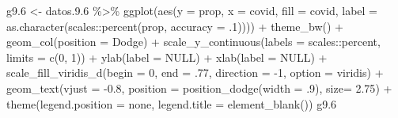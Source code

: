 \documentclass[
  12pt,
]{book}
\newenvironment{Shaded}{\begin{snugshade}}{\end{snugshade}}
\newcommand{\AttributeTok}[1]{\textcolor[rgb]{0.77,0.63,0.00}{#1}}
\newcommand{\ConstantTok}[1]{\textcolor[rgb]{0.00,0.00,0.00}{#1}}
\newcommand{\DecValTok}[1]{\textcolor[rgb]{0.00,0.00,0.81}{#1}}
\newcommand{\FloatTok}[1]{\textcolor[rgb]{0.00,0.00,0.81}{#1}}
\newcommand{\FunctionTok}[1]{\textcolor[rgb]{0.00,0.00,0.00}{#1}}
\newcommand{\NormalTok}[1]{#1}
\newcommand{\OtherTok}[1]{\textcolor[rgb]{0.56,0.35,0.01}{#1}}
\newcommand{\SpecialCharTok}[1]{\textcolor[rgb]{0.00,0.00,0.00}{#1}}
\newcommand{\StringTok}[1]{\textcolor[rgb]{0.31,0.60,0.02}{#1}}
\begin{document}
\begin{Shaded}
\begin{Highlighting}[]
\NormalTok{g9}\FloatTok{.6} \OtherTok{\textless{}{-}} 
\NormalTok{  datos.}\FloatTok{9.6} \SpecialCharTok{\%\textgreater{}\%} 
  \FunctionTok{ggplot}\NormalTok{(}\FunctionTok{aes}\NormalTok{(}\AttributeTok{y =}\NormalTok{ prop, }\AttributeTok{x =}\NormalTok{ covid, }\AttributeTok{fill =}\NormalTok{ covid, }
             \AttributeTok{label =} \FunctionTok{as.character}\NormalTok{(scales}\SpecialCharTok{::}\FunctionTok{percent}\NormalTok{(prop, }\AttributeTok{accuracy =}\NormalTok{ .}\DecValTok{1}\NormalTok{)))) }\SpecialCharTok{+} 
  \FunctionTok{theme\_bw}\NormalTok{() }\SpecialCharTok{+} 
  \FunctionTok{geom\_col}\NormalTok{(}\AttributeTok{position =} \StringTok{\textquotesingle{}Dodge\textquotesingle{}}\NormalTok{) }\SpecialCharTok{+}
  \FunctionTok{scale\_y\_continuous}\NormalTok{(}\AttributeTok{labels =}\NormalTok{ scales}\SpecialCharTok{::}\NormalTok{percent,}
                      \AttributeTok{limits =} \FunctionTok{c}\NormalTok{(}\DecValTok{0}\NormalTok{, }\DecValTok{1}\NormalTok{)) }\SpecialCharTok{+}
  \FunctionTok{ylab}\NormalTok{(}\AttributeTok{label =} \ConstantTok{NULL}\NormalTok{) }\SpecialCharTok{+}
  \FunctionTok{xlab}\NormalTok{(}\AttributeTok{label =} \ConstantTok{NULL}\NormalTok{) }\SpecialCharTok{+}
  \FunctionTok{scale\_fill\_viridis\_d}\NormalTok{(}\AttributeTok{begin =} \DecValTok{0}\NormalTok{, }\AttributeTok{end =}\NormalTok{ .}\DecValTok{77}\NormalTok{, }\AttributeTok{direction =} \SpecialCharTok{{-}}\DecValTok{1}\NormalTok{, }\AttributeTok{option =} \StringTok{\textquotesingle{}viridis\textquotesingle{}}\NormalTok{) }\SpecialCharTok{+}
  \FunctionTok{geom\_text}\NormalTok{(}\AttributeTok{vjust =} \SpecialCharTok{{-}}\FloatTok{0.8}\NormalTok{,}
            \AttributeTok{position =} \FunctionTok{position\_dodge}\NormalTok{(}\AttributeTok{width =}\NormalTok{ .}\DecValTok{9}\NormalTok{),}
            \AttributeTok{size=} \FloatTok{2.75}\NormalTok{) }\SpecialCharTok{+} 
  \FunctionTok{theme}\NormalTok{(}\AttributeTok{legend.position =} \StringTok{\textquotesingle{}none\textquotesingle{}}\NormalTok{,}
        \AttributeTok{legend.title =} \FunctionTok{element\_blank}\NormalTok{())}
\NormalTok{g9}\FloatTok{.6}
\end{Highlighting}
\end{Shaded}
\end{document}
